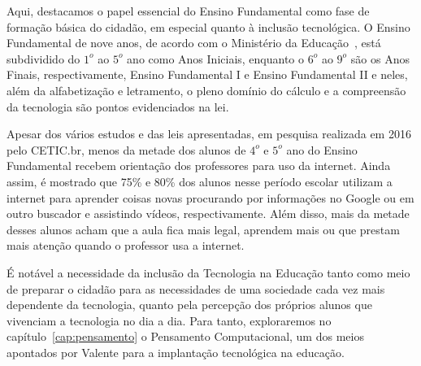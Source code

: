 Aqui, destacamos o papel essencial do Ensino Fundamental como fase de formação básica do cidadão, em especial quanto à inclusão tecnológica. O Ensino Fundamental de nove anos, de acordo com o Ministério da Educação~\cite{ministerio_da_educacao_ensino_2009}, está subdividido do $1^o$ ao $5^o$ ano como Anos Iniciais, enquanto o $6^o$ ao $9^o$ são os Anos Finais, respectivamente, Ensino Fundamental I e Ensino Fundamental II e neles, além da alfabetização e letramento, o pleno domínio do cálculo e a compreensão da tecnologia são pontos evidenciados na lei.

Apesar dos vários estudos e das leis apresentadas, em pesquisa realizada em 2016 pelo \acrfull{CETIC.br}, menos da metade dos alunos de $4^o$ e $5^o$ ano do Ensino Fundamental recebem orientação dos professores para uso da internet. Ainda assim, é mostrado que 75\% e 80\% dos alunos nesse período escolar utilizam a internet para aprender coisas novas procurando por informações no Google ou em outro buscador e assistindo vídeos, respectivamente. Além disso, mais da metade desses alunos acham que a aula fica mais legal, aprendem mais ou que prestam mais atenção quando o professor usa a internet.

É notável a necessidade da inclusão da Tecnologia na Educação tanto como meio de preparar o cidadão para as necessidades de uma sociedade cada vez mais dependente da tecnologia, quanto pela percepção dos próprios alunos que vivenciam a tecnologia no dia a dia. Para tanto, exploraremos no capítulo~\ref{cap:pensamento} o Pensamento Computacional, um dos meios apontados por Valente para a implantação tecnológica na educação.